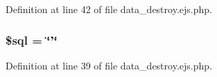 \-Definition at line 42 of file data\-\_\-destroy.\-ejs.\-php.

\hypertarget{patientfile_2immnunization_2data__destroy_8ejs_8php_a047170d6020a882807665812a27e2525}{
\subsubsection[{\$sql}]{\setlength{\rightskip}{0pt plus 5cm}\$sql = \char`\"{}'\char`\"{}}}\label{patientfile_2immnunization_2data__destroy_8ejs_8php_a047170d6020a882807665812a27e2525}


\-Definition at line 39 of file data\-\_\-destroy.\-ejs.\-php.

